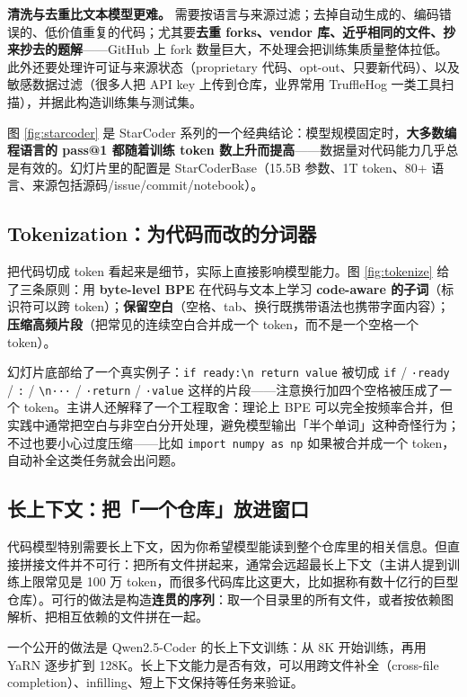 ﻿\documentclass[a4paper]{article}
\begin{document}
\textbf{清洗与去重比文本模型更难。} 需要按语言与来源过滤；去掉自动生成的、编码错误的、低价值重复的代码；尤其要\textbf{去重 forks、vendor 库、近乎相同的文件、抄来抄去的题解}——GitHub 上 fork 数量巨大，不处理会把训练集质量整体拉低。此外还要处理许可证与来源状态（proprietary 代码、opt-out、只要新代码）、以及敏感数据过滤（很多人把 API key 上传到仓库，业界常用 TruffleHog 一类工具扫描），并据此构造训练集与测试集。

图 \ref{fig:starcoder} 是 StarCoder 系列的一个经典结论：模型规模固定时，\textbf{大多数编程语言的 pass@1 都随着训练 token 数上升而提高}——数据量对代码能力几乎总是有效的。幻灯片里的配置是 StarCoderBase（15.5B 参数、1T token、80+ 语言、来源包括源码/issue/commit/notebook）。

\subsection{Tokenization：为代码而改的分词器}

把代码切成 token 看起来是细节，实际上直接影响模型能力。图 \ref{fig:tokenize} 给了三条原则：用 \textbf{byte-level BPE} 在代码与文本上学习 \textbf{code-aware 的子词}（标识符可以跨 token）；\textbf{保留空白}（空格、tab、换行既携带语法也携带字面内容）；\textbf{压缩高频片段}（把常见的连续空白合并成一个 token，而不是一个空格一个 token）。

幻灯片底部给了一个真实例子：\texttt{if ready:\textbackslash n return value} 被切成 \texttt{if} / \texttt{·ready} / \texttt{:} / \texttt{\textbackslash n···} / \texttt{·return} / \texttt{·value} 这样的片段——注意换行加四个空格被压成了一个 token。主讲人还解释了一个工程取舍：理论上 BPE 可以完全按频率合并，但实践中通常把空白与非空白分开处理，避免模型输出「半个单词」这种奇怪行为；不过也要小心过度压缩——比如 \texttt{import numpy as np} 如果被合并成一个 token，自动补全这类任务就会出问题。

\subsection{长上下文：把「一个仓库」放进窗口}

代码模型特别需要长上下文，因为你希望模型能读到整个仓库里的相关信息。但直接拼接文件并不可行：把所有文件拼起来，通常会远超最长上下文（主讲人提到训练上限常见是 100 万 token，而很多代码库比这更大，比如据称有数十亿行的巨型仓库）。可行的做法是构造\textbf{连贯的序列}：取一个目录里的所有文件，或者按依赖图解析、把相互依赖的文件拼在一起。

一个公开的做法是 Qwen2.5-Coder 的长上下文训练：从 8K 开始训练，再用 YaRN 逐步扩到 128K。长上下文能力是否有效，可以用跨文件补全（cross-file completion）、infilling、短上下文保持等任务来验证。
\end{document}
